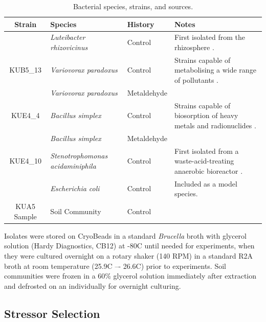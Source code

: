 \documentclass[final,1p,times]{elsarticle}
\begin{document}
\begin{table}[ht]
\begin{small}
\centering
\begin{tabular}{c p{3.1cm} l p{5.2cm}}
\toprule 
\textbf{{Strain}} & \textbf{{Species}} & \textbf{{History}} & \textbf{{Notes}} \\
\midrule
\rowcolor{gggrey}{LUF4\_5} & \textit{Luteibacter rhizovicinus} & Control & First isolated from the rhizosphere \cite{Johansen2005LuteibacterL.}. \\
{KUB5\_13} & \textit{Variovorax paradoxus} & Control & Strains capable of metabolising a wide range of pollutants \cite{Satola2013MetabolicParadoxus}. \\
\rowcolor{gggrey}{NUF1\_3} & \textit{Variovorax paradoxus} & Metaldehyde & \\
{KUE4\_4} & \textit{Bacillus simplex} & Control & Strains capable of biosorption of heavy metals and radionuclides \cite{Valentine1996BiosorptionZone}. \\
\rowcolor{gggrey}{NUE1\_1} & \textit{Bacillus simplex} & Metaldehyde & \\
{KUE4\_10} & \textit{Stenotrophomonas \newline acidaminiphila} & Control & First isolated from a waste-acid-treating anaerobic bioreactor \cite{Assih2002}. \\
\rowcolor{gggrey}{OP50} & \textit{Escherichia coli} & Control & Included as a model species. \\
{KUA5 Sample} & Soil Community & Control & \\
\bottomrule
\end{tabular}
\caption{Bacterial species, strains, and sources.}
\label{tab:isolates}
\end{small}
\end{table}

Isolates were stored on CryoBeads in a standard \textit{Brucella} broth with glycerol solution (Hardy Diagnostics, CB12) at -80\textdegree C until needed for experiments, when they were cultured overnight on a rotary shaker (140 RPM) in a standard R2A broth at room temperature (25.9\textdegree C –- 26.6\textdegree C) prior to experiments. Soil communities were frozen in a 60\% glycerol solution immediately after extraction and defrosted on an individually for overnight culturing. 

\subsection{Stressor Selection}
\label{S:2:2}
\end{document}
